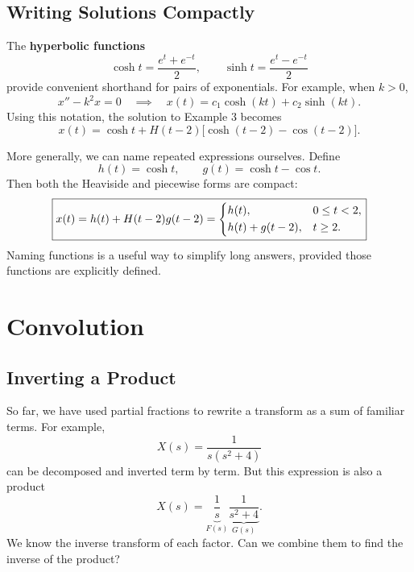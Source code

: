 \documentclass[10pt,letterpaper]{article}
\begin{document}
\begin{example}[3]
\end{example}


\subsection{Writing Solutions Compactly}

The \textbf{hyperbolic functions}
\[
\cosh t=\frac{e^t+e^{-t}}{2},
\qquad
\sinh t=\frac{e^t-e^{-t}}{2}
\]
provide convenient shorthand for pairs of exponentials.
For example, when $k>0$,
\[
x''-k^2x=0
\quad\implies\quad
x(t)=c_1\cosh(kt)+c_2\sinh(kt).
\]
Using this notation, the solution to Example 3 becomes
\[
x(t)=\cosh t
+H(t-2)\bigl[\cosh(t-2)-\cos(t-2)\bigr].
\]

More generally, we can name repeated expressions ourselves.
Define
\[
h(t)=\cosh t,
\qquad
g(t)=\cosh t-\cos t.
\]
Then both the Heaviside and piecewise forms are compact:
\[
\boxed{
x(t)=h(t)+H(t-2)g(t-2)
=
\begin{dcases}
h(t), & 0\le t<2,\\
h(t)+g(t-2), & t\ge2.
\end{dcases}
}
\]
Naming functions is a useful way to simplify long answers,
provided those functions are explicitly defined.
\section{Convolution}

\subsection{Inverting a Product}

So far, we have used partial fractions to rewrite a
transform as a sum of familiar terms. For example,
\[
X(s)=\frac{1}{s(s^2+4)}
\]
can be decomposed and inverted term by term. But this expression is also a product 
\[
X(s)=
\underbrace{\frac1s}_{F(s)}
\underbrace{\frac1{s^2+4}}_{G(s)}.
\]
We know the inverse transform of each factor.
Can we combine them to find the inverse of the product?
\end{document}
